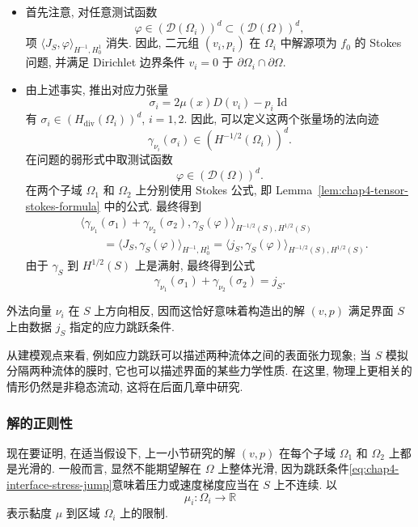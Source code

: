 \begin{itemize}
\item 首先注意, 对任意测试函数
\[
 \varphi\in(\mathcal D(\Omega_i))^d\subset(\mathcal D(\Omega))^d,
\]
项 $\langle J_S,\varphi\rangle_{H^{-1},H_0^1}$ 消失. 因此, 二元组 $(v_i,p_i)$ 在 $\Omega_i$ 中解源项为 $f_0$ 的 Stokes 问题, 并满足 Dirichlet 边界条件 $v_i=0$ 于 $\partial\Omega_i\cap\partial\Omega$.

\item 由上述事实, 推出对应力张量
\[
 \sigma_i=2\mu(x)D(v_i)-p_i\operatorname{Id}
\]
有 $\sigma_i\in(H_{\operatorname{div}}(\Omega_i))^d$, $i=1,2$. 因此, 可以定义这两个张量场的法向迹
\[
 \gamma_{\nu_i}(\sigma_i)\in(H^{-1/2}(\Omega_i))^d.
\]
在问题的弱形式中取测试函数
\[
 \varphi\in(\mathcal D(\Omega))^d.
\]
在两个子域 $\Omega_1$ 和 $\Omega_2$ 上分别使用 Stokes 公式, 即 Lemma~\ref{lem:chap4-tensor-stokes-formula} 中的公式. 最终得到
\begin{align*}
 &\bigl\langle\gamma_{\nu_1}(\sigma_1)+\gamma_{\nu_2}(\sigma_2),\gamma_S(\varphi)\bigr\rangle_{H^{-1/2}(S),H^{1/2}(S)}\\
 &\qquad=\langle J_S,\gamma_S(\varphi)\rangle_{H^{-1},H_0^1}
 =\langle j_S,\gamma_S(\varphi)\rangle_{H^{-1/2}(S),H^{1/2}(S)}.
\end{align*}
由于 $\gamma_S$ 到 $H^{1/2}(S)$ 上是满射, 最终得到公式
\begin{equation}
 \gamma_{\nu_1}(\sigma_1)+\gamma_{\nu_2}(\sigma_2)=j_S.
 \label{eq:chap4-interface-stress-jump}
\end{equation}
\end{itemize}

外法向量 $\nu_i$ 在 $S$ 上方向相反, 因而这恰好意味着构造出的解 $(v,p)$ 满足界面 $S$ 上由数据 $j_S$ 指定的应力跳跃条件.

从建模观点来看, 例如应力跳跃可以描述两种流体之间的表面张力现象; 当 $S$ 模拟分隔两种流体的膜时, 它也可以描述界面的某些力学性质. 在这里, 物理上更相关的情形仍然是非稳态流动, 这将在后面几章中研究.

\subsubsection{解的正则性}
\label{subsec:chap4-interface-regularity}

现在要证明, 在适当假设下, 上一小节研究的解 $(v,p)$ 在每个子域 $\Omega_1$ 和 $\Omega_2$ 上都是光滑的. 一般而言, 显然不能期望解在 $\Omega$ 上整体光滑, 因为跳跃条件\eqref{eq:chap4-interface-stress-jump}意味着压力或速度梯度应当在 $S$ 上不连续. 以
\[
 \mu_i:\Omega_i\longrightarrow\mathbb R
\]
表示黏度 $\mu$ 到区域 $\Omega_i$ 上的限制.

